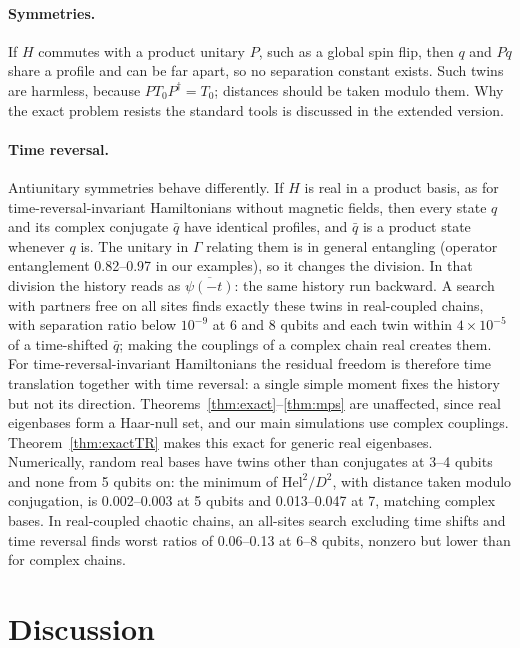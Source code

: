 \documentclass[11pt]{article}
\theoremstyle{definition}
\theoremstyle{remark}
\newcommand{\Hel}{\mathrm{Hel}}
\begin{document}
\paragraph{Symmetries.} If $H$ commutes with a product unitary $P$, such as a global spin flip, then $q$ and $Pq$ share a profile and can be far apart, so no separation constant exists. Such twins are harmless, because $PT_0P^\dagger=T_0$; distances should be taken modulo them. Why the exact problem resists the standard tools is discussed in the extended version.

\paragraph{Time reversal.} Antiunitary symmetries behave differently. If $H$ is real in a product basis, as for time-reversal-invariant Hamiltonians without magnetic fields, then every state $q$ and its complex conjugate $\bar q$ have identical profiles, and $\bar q$ is a product state whenever $q$ is. The unitary in $\Gamma$ relating them is in general entangling (operator entanglement 0.82--0.97 in our examples), so it changes the division. In that division the history reads as $\overline{\psi(-t)}$: the same history run backward. A search with partners free on all sites finds exactly these twins in real-coupled chains, with separation ratio below $10^{-9}$ at 6 and 8 qubits and each twin within $4\times10^{-5}$ of a time-shifted $\bar q$; making the couplings of a complex chain real creates them. For time-reversal-invariant Hamiltonians the residual freedom is therefore time translation together with time reversal: a single simple moment fixes the history but not its direction. Theorems~\ref{thm:exact}--\ref{thm:mps} are unaffected, since real eigenbases form a Haar-null set, and our main simulations use complex couplings. Theorem~\ref{thm:exactTR} makes this exact for generic real eigenbases. Numerically, random real bases have twins other than conjugates at 3--4 qubits and none from 5 qubits on: the minimum of $\Hel^2/D^2$, with distance taken modulo conjugation, is 0.002--0.003 at 5 qubits and 0.013--0.047 at 7, matching complex bases. In real-coupled chaotic chains, an all-sites search excluding time shifts and time reversal finds worst ratios of 0.06--0.13 at 6--8 qubits, nonzero but lower than for complex chains.

\section{Discussion}
\label{sec:discussion}
\end{document}

